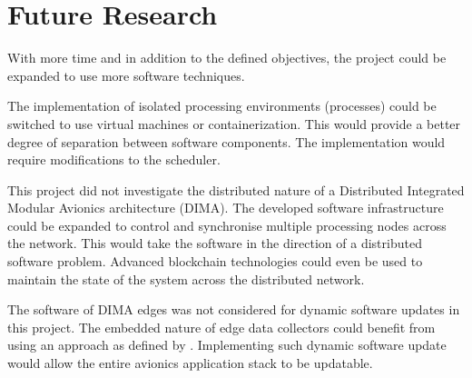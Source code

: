 \clearpage

\section{Future Research}

With more time and in addition to the defined objectives, the project could be expanded to use more software techniques.

The implementation of isolated processing environments (processes) could be switched to use virtual machines or containerization. This would provide a better degree of separation between software components. The implementation would require modifications to the scheduler.

This project did not investigate the distributed nature of a Distributed Integrated Modular Avionics architecture (DIMA). The developed software infrastructure could be expanded to control and synchronise multiple processing nodes across the network. This would take the software in the direction of a distributed software problem. Advanced blockchain technologies could even be used to maintain the state of the system across the distributed network.

The software of DIMA edges was not considered for dynamic software updates in this project. The embedded nature of edge data collectors could benefit from using an approach as defined by \textcite{raoLiveSeamlessFirmware2023}. Implementing such dynamic software update would allow the entire avionics application stack to be updatable.








